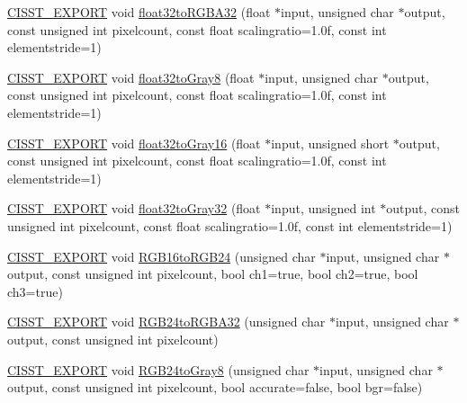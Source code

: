 \begin{DoxyCompactItemize}
\item 
\hyperlink{cmn_export_macros_8h_a99393e0c3ac434b2605235bbe20684f8}{C\-I\-S\-S\-T\-\_\-\-E\-X\-P\-O\-R\-T} void \hyperlink{namespacesvl_converter_a104731e2060e728361a80461b82c09ab}{float32to\-R\-G\-B\-A32} (float $\ast$input, unsigned char $\ast$output, const unsigned int pixelcount, const float scalingratio=1.\-0f, const int elementstride=1)
\item 
\hyperlink{cmn_export_macros_8h_a99393e0c3ac434b2605235bbe20684f8}{C\-I\-S\-S\-T\-\_\-\-E\-X\-P\-O\-R\-T} void \hyperlink{namespacesvl_converter_a66e448744c9ea94d05b30ec84c394a3e}{float32to\-Gray8} (float $\ast$input, unsigned char $\ast$output, const unsigned int pixelcount, const float scalingratio=1.\-0f, const int elementstride=1)
\item 
\hyperlink{cmn_export_macros_8h_a99393e0c3ac434b2605235bbe20684f8}{C\-I\-S\-S\-T\-\_\-\-E\-X\-P\-O\-R\-T} void \hyperlink{namespacesvl_converter_a7da024e110184a47aa479de560d97281}{float32to\-Gray16} (float $\ast$input, unsigned short $\ast$output, const unsigned int pixelcount, const float scalingratio=1.\-0f, const int elementstride=1)
\item 
\hyperlink{cmn_export_macros_8h_a99393e0c3ac434b2605235bbe20684f8}{C\-I\-S\-S\-T\-\_\-\-E\-X\-P\-O\-R\-T} void \hyperlink{namespacesvl_converter_a7436757981689049508c417b721a5f58}{float32to\-Gray32} (float $\ast$input, unsigned int $\ast$output, const unsigned int pixelcount, const float scalingratio=1.\-0f, const int elementstride=1)
\item 
\hyperlink{cmn_export_macros_8h_a99393e0c3ac434b2605235bbe20684f8}{C\-I\-S\-S\-T\-\_\-\-E\-X\-P\-O\-R\-T} void \hyperlink{namespacesvl_converter_a6bb8dfadfd1afdfce623f2b5c452b945}{R\-G\-B16to\-R\-G\-B24} (unsigned char $\ast$input, unsigned char $\ast$output, const unsigned int pixelcount, bool ch1=true, bool ch2=true, bool ch3=true)
\item 
\hyperlink{cmn_export_macros_8h_a99393e0c3ac434b2605235bbe20684f8}{C\-I\-S\-S\-T\-\_\-\-E\-X\-P\-O\-R\-T} void \hyperlink{namespacesvl_converter_ac83ca60b2d7928b474ac25b906be8e41}{R\-G\-B24to\-R\-G\-B\-A32} (unsigned char $\ast$input, unsigned char $\ast$output, const unsigned int pixelcount)
\item 
\hyperlink{cmn_export_macros_8h_a99393e0c3ac434b2605235bbe20684f8}{C\-I\-S\-S\-T\-\_\-\-E\-X\-P\-O\-R\-T} void \hyperlink{namespacesvl_converter_aea475d02307f7b6bd0a4c3b109c2371f}{R\-G\-B24to\-Gray8} (unsigned char $\ast$input, unsigned char $\ast$output, const unsigned int pixelcount, bool accurate=false, bool bgr=false)

\end{DoxyCompactItemize}
